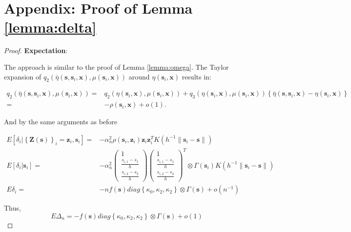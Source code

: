 \documentclass[authoryear,review, 12pt]{elsarticle}
\begin{document}
\section*{Appendix: Proof of Lemma \ref{lemma:delta}}
\begin{proof}
\textbf{Expectation}:

The approach is similar to the proof of Lemma \ref{lemma:omega}.
The Taylor expansion of $q_{2}\left(\bar{\eta}\left(\bm{s},\bm{s}_{i},\bm{x}\right),\mu\left(\bm{s}_{i},\bm{x}\right)\right)$
around $\eta\left(\bm{s}_{i},\bm{x}\right)$ results in:

\begin{align*}
q_{2}\left(\bar{\eta}\left(\bm{s},\bm{s}_{i},\bm{x}\right),\mu\left(\bm{s}_{i},\bm{x}\right)\right)= & q_{2}\left(\eta\left(\bm{s}_{i},\bm{x}\right),\mu\left(\bm{s}_{i},\bm{x}\right)\right)+q_{3}\left(\eta\left(\bm{s}_{i},\bm{x}\right),\mu\left(\bm{s}_{i},\bm{x}\right)\right)\left\{ \bar{\eta}\left(\bm{s},\bm{s}_{i},\bm{x}\right)-\eta\left(\bm{s}_{i},\bm{x}\right)\right\} \\
= & -\rho\left(\bm{s}_{i},\bm{x}\right)+o\left(1\right).
\end{align*}


And by the same arguments as before

\begin{align*}
E\left[\delta_{i}|\left\{ \bm{Z}\left(\bm{s}\right)\right\} _{i}=\bm{z}_{i},\bm{s}_{i}\right]= & -\alpha_{n}^{2}\rho\left(\bm{s}_{i},\bm{z}_{i}\right)\bm{z}_{i}\bm{z}_{i}^{T}K\left(h^{-1}\|\bm{s}_{i}-\bm{s}\|\right)\\
E\left[\delta_{i}|\bm{s}_{i}\right]= & -\alpha_{n}^{2}\left(\begin{array}{c}
1\\
\frac{s_{i,1}-s_{1}}{h}\\
\frac{s_{i,2}-s_{2}}{h}
\end{array}\right)\left(\begin{array}{c}
1\\
\frac{s_{i,1}-s_{1}}{h}\\
\frac{s_{i,2}-s_{2}}{h}
\end{array}\right)^{T}\otimes\Gamma\left(\bm{s}_{i}\right)K\left(h^{-1}\|\bm{s}_{i}-\bm{s}\|\right)\\
E\delta_{i}= & -nf\left(\bm{s}\right)diag\left\{ \kappa_{0},\kappa_{2},\kappa_{2}\right\} \otimes\Gamma\left(\bm{s}\right)+o\left(n^{-1}\right)
\end{align*}


Thus, 
\[
E\Delta_{n}=-f\left(\bm{s}\right)diag\left\{ \kappa_{0},\kappa_{2},\kappa_{2}\right\} \otimes\Gamma\left(\bm{s}\right)+o\left(1\right)
\]



\end{proof}
\end{document}
